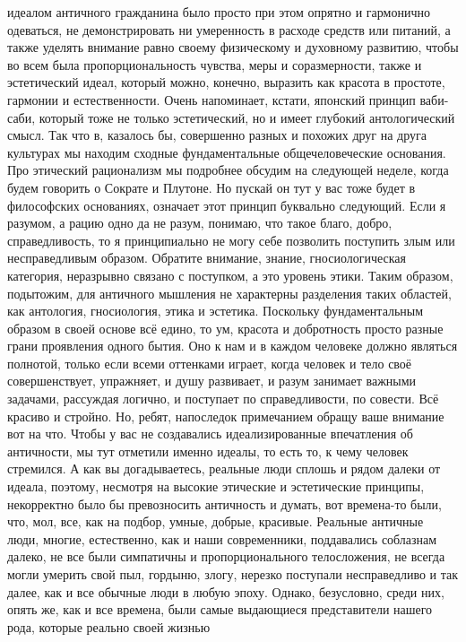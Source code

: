 идеалом античного гражданина было просто при этом опрятно и гармонично
одеваться, не демонстрировать ни умеренность в расходе средств или питаний, а
также уделять внимание равно своему физическому и духовному развитию, чтобы во
всем была пропорциональность чувства, меры и соразмерности, также и эстетический
идеал, который можно, конечно, выразить как красота в простоте, гармонии и
естественности. Очень напоминает, кстати, японский принцип ваби-саби, который
тоже не только эстетический, но и имеет глубокий антологический смысл. Так что
в, казалось бы, совершенно разных и похожих друг на друга культурах мы находим
сходные фундаментальные общечеловеческие основания. Про этический рационализм мы
подробнее обсудим на следующей неделе, когда будем говорить о Сократе и Плутоне.
Но пускай он тут у вас тоже будет в философских основаниях, означает этот
принцип буквально следующий. Если я разумом, а рацию одно да не разум, понимаю,
что такое благо, добро, справедливость, то я принципиально не могу себе
позволить поступить злым или несправедливым образом. Обратите внимание, знание,
гносиологическая категория, неразрывно связано с поступком, а это уровень этики.
Таким образом, подытожим, для античного мышления не характерны разделения таких
областей, как антология, гносиология, этика и эстетика. Поскольку
фундаментальным образом в своей основе всё едино, то ум, красота и добротность
просто разные грани проявления одного бытия. Оно к нам и в каждом человеке
должно являться полнотой, только если всеми оттенками играет, когда человек и
тело своё совершенствует, упражняет, и душу развивает, и разум занимает важными
задачами, рассуждая логично, и поступает по справедливости, по совести. Всё
красиво и стройно. Но, ребят, напоследок примечанием обращу ваше внимание вот на
что. Чтобы у вас не создавались идеализированные впечатления об античности, мы
тут отметили именно идеалы, то есть то, к чему человек стремился. А как вы
догадываетесь, реальные люди сплошь и рядом далеки от идеала, поэтому, несмотря
на высокие этические и эстетические принципы, некорректно было бы превозносить
античность и думать, вот времена-то были, что, мол, все, как на подбор, умные,
добрые, красивые. Реальные античные люди, многие, естественно, как и наши
современники, поддавались соблазнам далеко, не все были симпатичны и
пропорционального телосложения, не всегда могли умерить свой пыл, гордыню,
злогу, нерезко поступали несправедливо и так далее, как и все обычные люди в
любую эпоху. Однако, безусловно, среди них, опять же, как и все времена, были
самые выдающиеся представители нашего рода, которые реально своей жизнью
